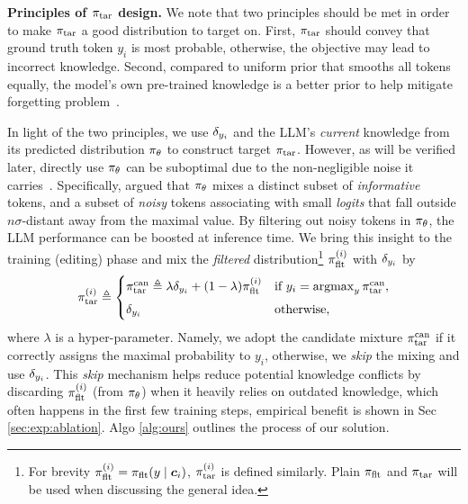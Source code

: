 \textbf{Principles of $\pi_\text{tar}$ design.}
We note that two principles should be met in order to make $\pi_\text{tar}$ a good distribution to target on. 
First,  $\pi_\text{tar}$ should convey that ground truth token $y_i$ is most probable, otherwise, the objective may lead to incorrect knowledge. 
Second, compared to uniform prior that smooths all tokens equally, 
the model's own pre-trained knowledge is a better prior to help mitigate forgetting problem~\citep{zhang2020self,lee2022adaptive}.  


In light of the two principles, we use
$\de{y_i}{}$ and the LLM's \textit{current} knowledge from its predicted distribution $\pi_\theta$ to construct target $\pi_\text{tar}$.
However, as will be verified later, directly use $\pi_\theta$ can be suboptimal due to the non-negligible noise it carries~\citep{hewitt2022truncation,tang2024top}. 
Specifically, \citet{tang2024top} argued that $\pi_\theta$ mixes a distinct subset of \textit{informative} tokens, and a subset of \textit{noisy} tokens associating with small \textit{logits} that fall outside $n\sigma$-distant away from the maximal value. 
By filtering out noisy tokens in $\pi_\theta$, the LLM performance can be boosted at inference time. 
We bring this insight to the training (editing) phase and mix the \textit{filtered} distribution\footnote{For brevity $\pi_\text{flt}^{(i)} = \pi_\text{flt}( y \mid {\boldsymbol{c}}_i)$, $\pi_\text{tar}^{(i)}$ is defined similarly. Plain $\pi_\text{flt}$ and $\pi_\text{tar}$ will be used when discussing the general idea.} $\pi_\text{flt}^{(i)}$ with $\de{y_i}{}$ by
\begin{align}
\label{eq:mix}
\pit^{(i)} \triangleq
\begin{cases}
\pit^\text{can} \triangleq \lambda \de{y_i}{} + (1 - \lambda) \pif^{(i)} & \text{if $y_i = \argmax_y \pit^\text{can}$}, \\[1ex]
\de{y_i}{} & \text{otherwise},
\end{cases}
\end{align}
% 
% 
where $\lambda$ is a hyper-parameter. 
Namely, we adopt the candidate mixture $\pi_\text{tar}^\text{can}$ if it correctly assigns the maximal probability to $y_i$, otherwise, we \textit{skip} the mixing and use $\de{y_i}{}$. 
This \textit{skip} mechanism helps reduce potential knowledge conflicts by discarding $\pi_\text{flt}^{(i)}$ (from $\pi_\theta$) when it heavily relies on outdated knowledge, which often happens in the first few training steps, empirical benefit is shown in Sec \ref{sec:exp:ablation}. 
Algo \ref{alg:ours} outlines the process of our solution. 


